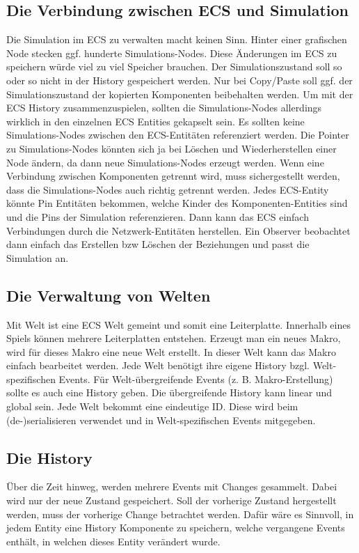 \documentclass[11pt]{article}
\begin{document}
    \subsection{Die Verbindung zwischen ECS und Simulation}
    Die Simulation im ECS zu verwalten macht keinen Sinn.
    Hinter einer grafischen Node stecken ggf. hunderte Simulations-Nodes.
    Diese Änderungen im ECS zu speichern würde viel zu viel Speicher brauchen.
    Der Simulationszustand soll so oder so nicht in der History gespeichert werden.
    Nur bei Copy/Paste soll ggf. der Simulationszustand der kopierten Komponenten beibehalten werden.
    Um mit der ECS History zusammenzuspielen, sollten die Simulations-Nodes allerdings wirklich in den einzelnen
    ECS Entities gekapselt sein.
    Es sollten keine Simulations-Nodes zwischen den ECS-Entitäten referenziert werden.
    Die Pointer zu Simulations-Nodes könnten sich ja bei Löschen und Wiederherstellen einer Node ändern, da dann
    neue Simulations-Nodes erzeugt werden.
    Wenn eine Verbindung zwischen Komponenten getrennt wird, muss sichergestellt werden, dass die Simulations-Nodes auch richtig getrennt
    werden.
    Jedes ECS-Entity könnte Pin Entitäten bekommen, welche Kinder des Komponenten-Entities sind und die Pins der Simulation referenzieren.
    Dann kann das ECS einfach Verbindungen durch die Netzwerk-Entitäten herstellen.
    Ein Observer beobachtet dann einfach das Erstellen bzw Löschen der Beziehungen und passt die Simulation an.

    \subsection{Die Verwaltung von Welten}
    Mit Welt ist eine ECS Welt gemeint und somit eine Leiterplatte.
    Innerhalb eines Spiels können mehrere Leiterplatten entstehen.
    Erzeugt man ein neues Makro, wird für dieses Makro eine neue Welt erstellt.
    In dieser Welt kann das Makro einfach bearbeitet werden.
    Jede Welt benötigt ihre eigene History bzgl. Welt-spezifischen Events.
    Für Welt-übergreifende Events (z. B. Makro-Erstellung) sollte es auch eine History geben.
    Die übergreifende History kann linear und global sein.
    Jede Welt bekommt eine eindeutige ID.
    Diese wird beim (de-)serialisieren verwendet und in Welt-spezifischen Events mitgegeben.

    \subsection{Die History}
    Über die Zeit hinweg, werden mehrere Events mit Changes gesammelt.
    Dabei wird nur der neue Zustand gespeichert.
    Soll der vorherige Zustand hergestellt werden, muss der vorherige Change betrachtet werden.
    Dafür wäre es Sinnvoll, in jedem Entity eine History Komponente zu speichern,
    welche vergangene Events enthält, in welchen dieses Entity verändert wurde.
\end{document}
